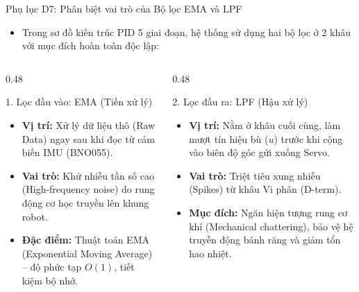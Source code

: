 \documentclass[10pt,aspectratio=169]{beamer}
\begin{document}
\begin{frame}{Phụ lục D7: Phân biệt vai trò của Bộ lọc EMA và LPF}
  \begin{itemize}
      \item Trong sơ đồ kiến trúc PID 5 giai đoạn, hệ thống sử dụng hai bộ lọc ở 2 khâu với mục đích hoàn toàn độc lập:
  \end{itemize}
  \vspace{0.2cm}
  \begin{columns}[t]
      \begin{column}{0.48\textwidth}
          \begin{block}{1. Lọc đầu vào: EMA (Tiền xử lý)}
              \begin{itemize}
                  \item \textbf{Vị trí:} Xử lý dữ liệu thô (Raw Data) ngay sau khi đọc từ cảm biến IMU (BNO055).
                  \item \textbf{Vai trò:} Khử nhiễu tần số cao (High-frequency noise) do rung động cơ học truyền lên khung robot.
                  \item \textbf{Đặc điểm:} Thuật toán EMA (Exponential Moving Average) -- độ phức tạp $O(1)$, tiết kiệm bộ nhớ.
              \end{itemize}
          \end{block}
      \end{column}
      \begin{column}{0.48\textwidth}
          \begin{block}{2. Lọc đầu ra: LPF (Hậu xử lý)}
              \begin{itemize}
                  \item \textbf{Vị trí:} Nằm ở khâu cuối cùng, làm mượt tín hiệu bù ($u$) trước khi cộng vào biên độ góc gửi xuống Servo.
                  \item \textbf{Vai trò:} Triệt tiêu xung nhiễu (Spikes) từ khâu Vi phân (D-term).
                  \item \textbf{Mục đích:} Ngăn hiện tượng rung cơ khí (Mechanical chattering), bảo vệ hệ truyền động bánh răng và giảm tổn hao nhiệt.
              \end{itemize}
          \end{block}
      \end{column}
  \end{columns}
\end{frame}
\end{document}
